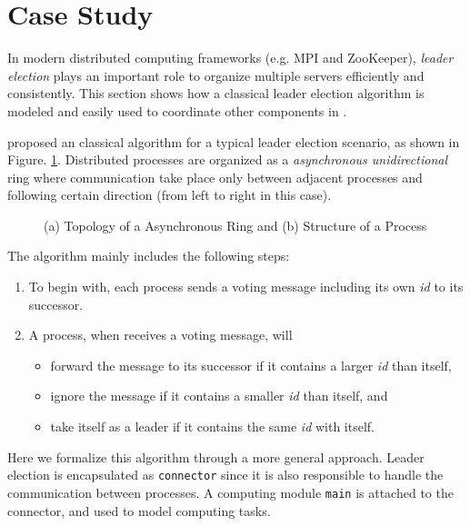 \section{Case Study}
\label{sec:casestudy}

In modern distributed computing frameworks (e.g. MPI and ZooKeeper), \emph{leader election} plays an important role to organize multiple servers efficiently and consistently. This section shows how a classical leader election algorithm is modeled and easily used to coordinate other components in \lang{}.

 \cite{HagitDistributed2004} proposed an classical algorithm for a typical leader election scenario, as shown in Figure. \ref{fig:leaderelection}. Distributed processes are organized as a \emph{asynchronous unidirectional} ring where communication take place only between adjacent processes and following certain direction (from left to right in this case).

\begin{figure}
	\centering
	\resizebox{.8\textwidth}{!}{
        
    }
	\caption{(a) Topology of a Asynchronous Ring and (b) Structure of a Process}
	\label{fig:leaderelection}
\end{figure}

The algorithm mainly includes the following steps:
\begin{enumerate}
	\item To begin with, each process sends a voting message including its own \emph{id} to its successor.
	\item A process, when receives a voting message, will
	\begin{itemize}
		\item forward the message to its successor if it contains a larger \emph{id} than itself,
		\item ignore the message if it contains a smaller \emph{id} than itself, and
		\item take itself as a leader if it contains the same \emph{id} with itself.
	\end{itemize} 
\end{enumerate}

Here we formalize this algorithm through a more general approach. Leader election is encapsulated as \texttt{connector} since it is also responsible to handle the communication between processes. A computing module \texttt{main} is attached to the connector, and used to model computing tasks. 

